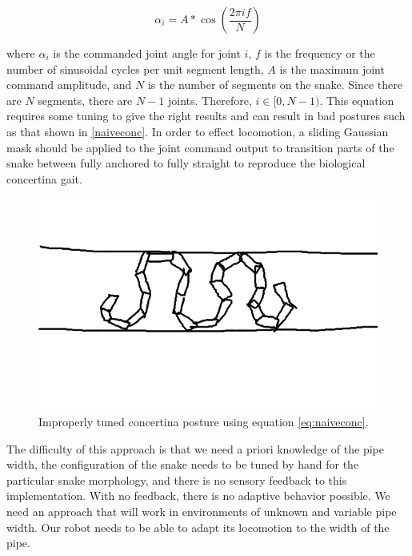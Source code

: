 \begin{equation}
\label{eq:naiveconc}
\alpha_i = A * \cos \left( \frac{ 2 \pi if}{N} \right)
\end{equation}


where $\alpha_i$ is the commanded joint angle for joint $i$, $f$ is the frequency or the number of sinusoidal cycles per unit segment length, $A$ is the maximum joint command amplitude, and $N$ is the number of segments on the snake. Since there are $N$ segments, there are $N-1$ joints. Therefore, $i \in [0,N-1)$. This equation requires some tuning to give the right results and can result in bad postures such as that shown in \autoref{naiveconc}. In order to effect locomotion, a sliding Gaussian mask should be applied to the joint command output to transition parts of the snake between fully anchored to fully straight to reproduce the biological concertina gait.

\begin{figure}[htbp]
\centering
\includegraphics[keepaspectratio,width=400pt,height=0.75\textheight]{2_problem_1.png}
\caption{Improperly tuned concertina posture using equation \autoref{eq:naiveconc}.}
\label{naiveconc}
\end{figure}



The difficulty of this approach is that we need a priori knowledge of the pipe width, the configuration of the snake needs to be tuned by hand for the particular snake morphology, and there is no sensory feedback to this implementation. With no feedback, there is no adaptive behavior possible. We need an approach that will work in environments of unknown and variable pipe width. Our robot needs to be able to adapt its locomotion to the width of the pipe.

